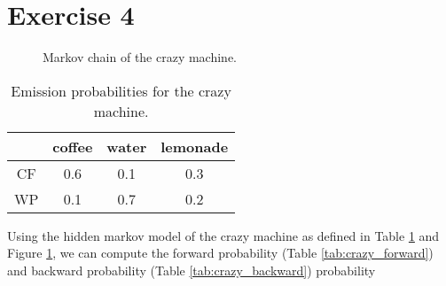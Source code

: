 \documentclass{article}
\begin{document}
\section*{Exercise 4}
\begin{figure}[h]
\center
{}
\caption{Markov chain of the crazy machine.}
\label{fig:crazy_machine}
\end{figure}
\begin{table}
\center
\begin{tabular}{|c|c|c|c|}
	\hline
	   & coffee & water & lemonade \\  \hline
	CF & 0.6 & 0.1 & 0.3 		\\ \hline
	WP & 0.1 & 0.7 & 0.2 		\\ 	
	\hline
\end{tabular}
\caption{Emission probabilities for the crazy machine.}
\label{tab:crazy_machine}
\end{table}
Using the hidden markov model of the crazy machine as defined in Table \ref{tab:crazy_machine} and Figure \ref{fig:crazy_machine}, we can compute the forward probability (Table \ref{tab:crazy_forward}) and backward
probability (Table \ref{tab:crazy_backward})
probability
\end{document}

